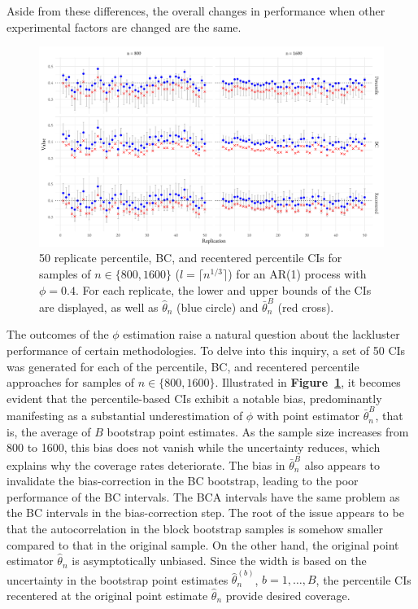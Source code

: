 \documentclass[10pt]{article}
\begin{document}
Aside from these differences, the overall changes
in performance when other experimental factors are changed are the same.

\begin{figure}[tbp]
  \centering
  \includegraphics[width=\textwidth]{figures/norm_phi_intervals}
  \caption{50 replicate percentile, BC, and recentered percentile CIs for 
    samples of $n \in \{800, 1600\}$ ($l = \lceil n^{1/3} \rceil$)
    for an AR(1) process with $\phi = 0.4$. For 
    each replicate, the lower and upper bounds of the CIs are displayed, as well 
    as $\hat\theta_n$ (blue circle) and $\bar\theta_n^{B}$ (red cross).}
  \label{fig:npi}
\end{figure}


The outcomes of the $\phi$ estimation raise a natural question about the 
lackluster performance of certain methodologies. To delve into this inquiry, a
set of 50 CIs was generated for each of the percentile, BC, and recentered
percentile  approaches for samples of $n \in \{800, 1600\}$. Illustrated in 
\textbf{Figure~\ref{fig:npi}}, it becomes evident that the percentile-based CIs 
exhibit a notable bias, predominantly manifesting as a substantial 
underestimation of $\phi$ with point estimator $\bar\theta_n^B$, that is, the 
average of $B$ bootstrap point estimates. As the sample size increases from 800 
to 1600, this bias does not vanish while the uncertainty reduces, which explains 
why the coverage rates deteriorate. The bias in $\bar\theta_n^B$ also appears to 
invalidate the bias-correction in the BC bootstrap, leading to the poor 
performance of the BC intervals. The BCA intervals have the same problem as the 
BC intervals in the bias-correction step. The root of the issue appears to be 
that the autocorrelation in the block bootstrap samples is somehow smaller 
compared to that in the original sample. On the other hand, the original point 
estimator $\hat\theta_n$ is asymptotically unbiased. Since the width is based on 
the uncertainty in the bootstrap point estimates $\hat\theta_n^{(b)}$, 
$b = 1, \ldots, B$, the percentile CIs recentered at the original point estimate
$\hat\theta_n$ provide desired coverage.
\end{document}
